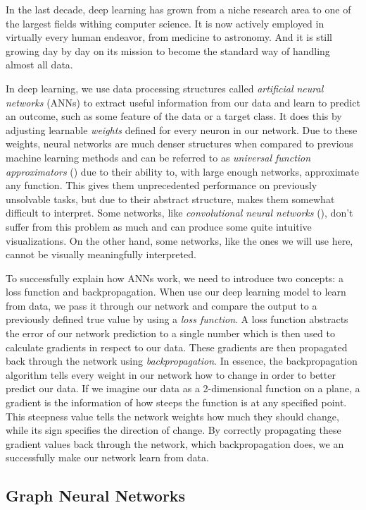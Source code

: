 \documentclass[times, utf8, diplomski, english]{fer_eng}
\begin{document}
In the last decade, deep learning has grown from a niche research area to one of the largest fields withing computer science. It is now actively employed in virtually every human endeavor, from medicine to astronomy. And it is still growing day by day on its mission to become the standard way of handling almost all data.

In deep learning, we use data processing structures called \textit{artificial neural networks} (ANNs) to extract useful information from our data and learn to predict an outcome, such as some feature of the data or a target class. It does this by adjusting learnable \textit{weights} defined for every neuron in our network. Due to these weights, neural networks are much denser structures when compared to previous machine learning methods and can be referred to as \textit{universal function approximators} (\cite{uni_approx}) due to their ability to, with large enough networks, approximate any function. This gives them unprecedented performance on previously unsolvable tasks, but due to their abstract structure, makes them somewhat difficult to interpret. Some networks, like \textit{convolutional neural networks} (\cite{CNN}), don't suffer from this problem as much and can produce some quite intuitive visualizations. On the other hand, some networks, like the ones we will use here, cannot be visually meaningfully interpreted.

To successfully explain how ANNs work, we need to introduce two concepts: a loss function and backpropagation. When use our deep learning model to learn from data, we pass it through our network and compare the output to a previously defined true value by using a \textit{loss function}. A loss function abstracts the error of our network prediction to a single number which is then used to calculate gradients in respect to our data. These gradients are then propagated back through the network using \textit{backpropagation}. In essence, the backpropagation algorithm tells every weight in our network how to change in order to better predict our data. If we imagine our data as a 2-dimensional function on a plane, a gradient is the information of how steeps the function is at any specified point. This steepness value tells the network weights how much they should change, while its sign specifies the direction of change. By correctly propagating these gradient values back through the network, which backpropagation does, we an successfully make our network learn from data.

\subsection{Graph Neural Networks}
\end{document}
